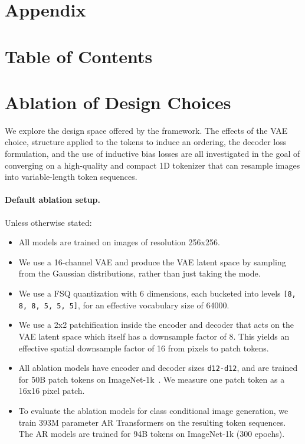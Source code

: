 \clearpage
\appendix
\onecolumn

\section*{\LARGE Appendix}
\section*{Table of Contents}
\startcontents[appendices]
\newpage


\section{Ablation of \ours Design Choices}
\label{sec:app_ablations_flextok}
We explore the design space offered by the \ours framework. The effects of the VAE choice, structure applied to the tokens to induce an ordering, the decoder loss formulation, and the use of inductive bias losses are all investigated in the goal of converging on a high-quality and compact 1D tokenizer that can resample images into variable-length token sequences. 

\paragraph{Default ablation setup.}
Unless otherwise stated:
\begin{itemize}
    \item All models are trained on images of resolution 256x256. 
    \item We use a 16-channel VAE and produce the VAE latent space by sampling from the Gaussian distributions, rather than just taking the mode.
    \item We use a FSQ quantization with 6 dimensions, each bucketed into levels \texttt{[8, 8, 8, 5, 5, 5]}, for an effective vocabulary size of \num{64000}. 
    \item We use a 2x2 patchification inside the \ours encoder and decoder that acts on the VAE latent space which itself has a downsample factor of 8. This yields an effective spatial downsample factor of 16 from pixels to patch tokens.
    \item All \ours ablation models have encoder and decoder sizes \texttt{d12-d12}, and are trained for 50B patch tokens on ImageNet-1k~\cite{Russakovsky2014ImageNet}. We measure one patch token as a 16x16 pixel patch.
    \item To evaluate the ablation models for class conditional image generation, we train 393M parameter AR Transformers on the resulting token sequences. The AR models are trained for 94B tokens on ImageNet-1k (300 epochs).
\end{itemize}


